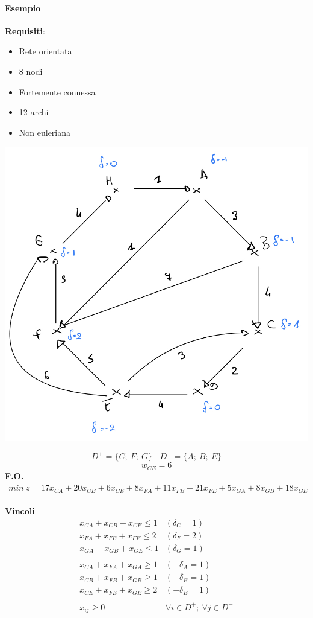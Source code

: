 \documentclass[12pt,a4paper]{article}
\begin{document}
\paragraph{Esempio \\}
\textbf{Requisiti}:
\begin{itemize}
\item Rete orientata
\item 8 nodi
\item Fortemente connessa
\item 12 archi
\item Non euleriana
\end{itemize}
\begin{center}
\includegraphics[width=0.4\columnwidth]{img/cpp_oriented_not_eul.jpeg}\\
\end{center}
$$D^+ =\{	C;\ F;\ G\} \ \ \ \ D^- = \{A;\ B;\ E\}$$
$$w_{CE} = 6$$
\textbf{F.O.} $\ \ min\ z = 17x_{CA} + 20x_{CB} + 6 x_{CE} + 8x_{FA} + 11x_{FB} + 21 x_{FE} + 5x_{GA} + 8x_{GB} + 18x_{GE}$\\
\\
\textbf{Vincoli}\\ $$\begin{array}{ll}
x_{CA} + x_{CB} + x_{CE} \leq 1 & (\delta_C =1)\\
x_{FA} + x_{FB} + x_{FE} \leq 2 & (\delta_F =2)\\
x_{GA} + x_{GB} + x_{GE} \leq 1 & (\delta_G =1)\\
\\
x_{CA} + x_{FA} + x_{GA} \geq 1 & (-\delta_A =1)\\
x_{CB} + x_{FB} + x_{GB} \geq 1 & (-\delta_B =1)\\
x_{CE} + x_{FE} + x_{GE} \geq 2 & (-\delta_E =1)\\
\\
x_{ij} \geq 0 & \forall i \in D^+; \ \forall j \in D^-\\
\end{array}$$
\end{document}
